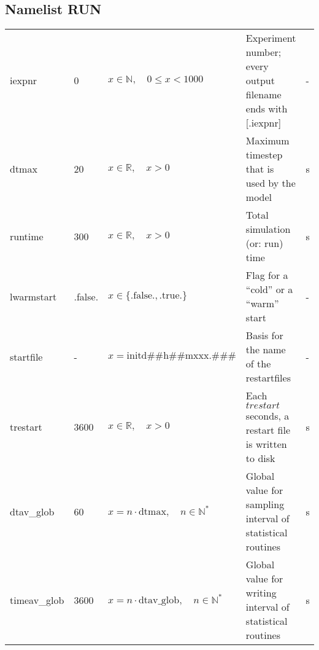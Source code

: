 \documentclass[twoside,11pt,fleqn,a4paper,english,openright]{report}
\begin{document}
\subsection{Namelist RUN}\label{par:run}

\begin{center}
  \tablelasttail{
        &&&&\\\hline
  }
\begin{supertabular}{|l|p{1.6cm}|p{4.4cm}|p{6cm}|l|}
  iexpnr	& 0		& $x \in \mathbb{N}, \quad 0 \leq  x < 1000$		& Experiment number; every output filename ends with [.iexpnr]	& -\\
  \hypertarget{dtmax}{dtmax}	& 20		& $x \in \mathbb{R}, \quad x>0$		& Maximum timestep that is used by the model	& s\\
  runtime	& 300		& $x \in \mathbb{R}, \quad x>0$		& Total simulation (or: run) time		& s\\
  lwarmstart& .false.	& $x\in\{\text{.false.},\text{.true.}\}$		& Flag for a ``cold'' or a  ``warm'' start	& -\\
  startfile	& -		& $x = \text{initd\#\#h\#\#mxxx.\#\#\#}$	& Basis for the name of the restartfiles	& -\\
  trestart	& 3600		& $x \in \mathbb{R}, \quad x>0$		& Each $trestart$ seconds, a restart file is written to disk	& s\\
  dtav\_glob	& 60		& $x = n \cdot \text{dtmax}, \quad n \in \mathbb{N}^*$		& Global value for sampling interval of statistical routines	& s\\
  timeav\_glob	& 3600		& $x = n \cdot \text{dtav\_glob}, \quad n \in \mathbb{N}^*$	& Global value for writing interval of statistical routines	& s\\

\end{supertabular}
\end{center}
\end{document}
